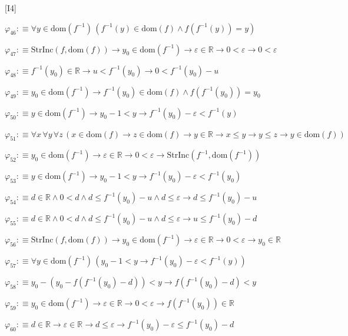 \begin{fullproof}{[I4]}
\begin{abbrevlist}
\item $\varphi_{46} :\equiv \forall y \in \mathrm{dom}(f^{-1})\,(f^{-1}(y) \in \mathrm{dom}(f) \land f(f^{-1}(y)) = y)$
\item $\varphi_{47} :\equiv \mathrm{StrInc}(f,\mathrm{dom}(f)) \to y_{0} \in \mathrm{dom}(f^{-1}) \to \varepsilon \in \mathbb{R} \to 0 < \varepsilon \to 0 < \varepsilon$
\item $\varphi_{48} :\equiv f^{-1}(y_{0}) \in \mathbb{R} \to u < f^{-1}(y_{0}) \to 0 < f^{-1}(y_{0}) - u$
\item $\varphi_{49} :\equiv y_{0} \in \mathrm{dom}(f^{-1}) \to f^{-1}(y_{0}) \in \mathrm{dom}(f) \land f(f^{-1}(y_{0})) = y_{0}$
\item $\varphi_{50} :\equiv y \in \mathrm{dom}(f^{-1}) \to y_{0} - 1 < y \to f^{-1}(y_{0}) - \varepsilon < f^{-1}(y)$
\item $\varphi_{51} :\equiv \forall x\,\forall y\,\forall z\,(x \in \mathrm{dom}(f) \to z \in \mathrm{dom}(f) \to y \in \mathbb{R} \to x \leq y \to y \leq z \to y \in \mathrm{dom}(f))$
\item $\varphi_{52} :\equiv y_{0} \in \mathrm{dom}(f^{-1}) \to \varepsilon \in \mathbb{R} \to 0 < \varepsilon \to \mathrm{StrInc}(f^{-1},\mathrm{dom}(f^{-1}))$
\item $\varphi_{53} :\equiv y \in \mathrm{dom}(f^{-1}) \to y_{0} - 1 < y \to f^{-1}(y_{0}) - \varepsilon < f^{-1}(y_{0})$
\item $\varphi_{54} :\equiv d \in \mathbb{R} \land 0 < d \land d \leq f^{-1}(y_{0}) - u \land d \leq \varepsilon \to d \leq f^{-1}(y_{0}) - u$
\item $\varphi_{55} :\equiv d \in \mathbb{R} \land 0 < d \land d \leq f^{-1}(y_{0}) - u \land d \leq \varepsilon \to u \leq f^{-1}(y_{0}) - d$
\item $\varphi_{56} :\equiv \mathrm{StrInc}(f,\mathrm{dom}(f)) \to y_{0} \in \mathrm{dom}(f^{-1}) \to \varepsilon \in \mathbb{R} \to 0 < \varepsilon \to y_{0} \in \mathbb{R}$
\item $\varphi_{57} :\equiv \forall y \in \mathrm{dom}(f^{-1})\,(y_{0} - 1 < y \to f^{-1}(y_{0}) - \varepsilon < f^{-1}(y))$
\item $\varphi_{58} :\equiv y_{0} - (y_{0} - f(f^{-1}(y_{0}) - d)) < y \to f(f^{-1}(y_{0}) - d) < y$
\item $\varphi_{59} :\equiv y_{0} \in \mathrm{dom}(f^{-1}) \to \varepsilon \in \mathbb{R} \to 0 < \varepsilon \to f(f^{-1}(y_{0})) \in \mathbb{R}$
\item $\varphi_{60} :\equiv d \in \mathbb{R} \to \varepsilon \in \mathbb{R} \to d \leq \varepsilon \to f^{-1}(y_{0}) - \varepsilon \leq f^{-1}(y_{0}) - d$

\end{abbrevlist}
\end{fullproof}
